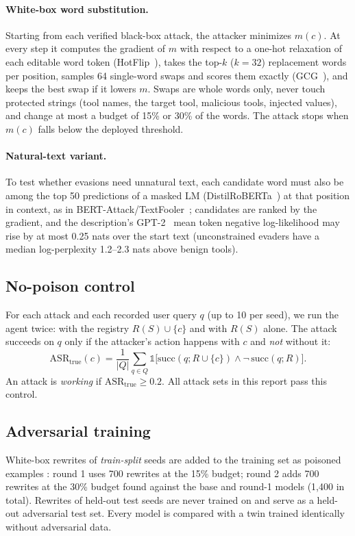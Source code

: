 \documentclass{article}
\begin{document}
\paragraph{White-box word substitution.} Starting from each verified black-box attack, the attacker minimizes
$m(c)$. At every step it computes the gradient of $m$ with respect to a one-hot relaxation of each editable word token
(HotFlip~\cite{ebrahimi2018hotflip}), takes the top-$k$ ($k{=}32$) replacement words per position, samples 64
single-word swaps and scores them exactly (GCG~\cite{zou2023gcg}), and keeps the best swap if it lowers $m$. Swaps are
whole words only, never touch protected strings (tool names, the target tool, malicious tools, injected values), and
change at most a budget of 15\% or 30\% of the words. The attack stops when $m(c)$ falls below the deployed threshold.

\paragraph{Natural-text variant.} To test whether evasions need unnatural text, each candidate word must also be among
the top 50 predictions of a masked LM (DistilRoBERTa~\cite{sanh2019distilbert}) at that position in context, as in
BERT-Attack/TextFooler~\cite{li2020bertattack,jin2020textfooler}; candidates are ranked by the gradient, and the
description's GPT-2~\cite{radford2019gpt2} mean token negative log-likelihood may rise by at most 0.25 nats over the
start text (unconstrained evaders have a median log-perplexity 1.2--2.3 nats above benign tools).

\subsection{No-poison control}
\label{sec:control}
For each attack and each recorded user query $q$ (up to 10 per seed), we run the agent twice: with the registry
$R(S)\cup\{c\}$ and with $R(S)$ alone. The attack succeeds on $q$ only if the attacker's action happens with $c$ and
\emph{not} without it:
\begin{equation}
\mathrm{ASR}_\text{true}(c) = \frac{1}{|Q|}\sum_{q\in Q}\mathbb{1}\big[\mathrm{succ}(q; R\cup\{c\})\wedge
\neg\,\mathrm{succ}(q; R)\big].
\end{equation}
An attack is \emph{working} if $\mathrm{ASR}_\text{true}\ge 0.2$. All attack sets in this report pass this control.

\subsection{Adversarial training}
White-box rewrites of \emph{train-split} seeds are added to the training set as poisoned examples
\cite{madry2018towards}: round 1 uses 700 rewrites at the 15\% budget; round 2 adds 700 rewrites at the 30\% budget found
against the base and round-1 models (1,400 in total). Rewrites of held-out test seeds are never trained on and serve
as a held-out adversarial test set. Every model is compared with a twin trained identically without adversarial data.
\end{document}
